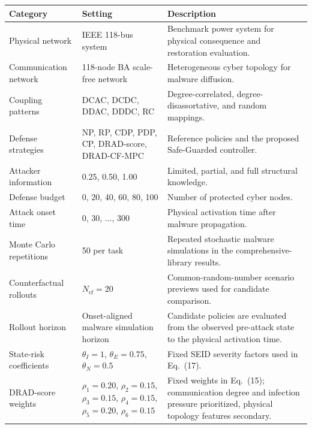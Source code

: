 \documentclass[10pt]{article}
\makeatletter
\newenvironment{exporttable}{\par\noindent\begin{minipage}{\linewidth}\def\@captype{table}}{\end{minipage}\par}
\makeatother
\begin{document}
\begin{exporttable}
\centering
\caption{Reference configuration for the comprehensive policy-library assessment. Rolling and local-information protocols specify their own rollout counts and risk profiles.}
\label{tab:experimental_configuration}
\small
\begin{tabular}{p{} p{} p{}}
\toprule
\rowcolor{TableHeader}
Category & Setting & Description \\
\midrule
\rowcolor{RowScenario}
Physical network & IEEE 118-bus system & Benchmark power system for physical consequence and restoration evaluation. \\
\rowcolor{RowBaseline}
Communication network & 118-node BA scale-free network & Heterogeneous cyber topology for malware diffusion. \\
\rowcolor{RowScenario}
Coupling patterns & DCAC, DCDC, DDAC, DDDC, RC & Degree-correlated, degree-disassortative, and random mappings. \\
\rowcolor{RowProposed}
Defense strategies & NP, RP, CDP, PDP, CP, DRAD-score, DRAD-CF-MPC & Reference policies and the proposed Safe-Guarded controller. \\
\rowcolor{RowRisk}
Attacker information & 0.25, 0.50, 1.00 & Limited, partial, and full structural knowledge. \\
\rowcolor{RowBudget}
Defense budget & 0, 20, 40, 60, 80, 100 & Number of protected cyber nodes. \\
\rowcolor{RowPhysical}
Attack onset time & 0, 30, $\ldots$, 300 & Physical activation time after malware propagation. \\
\rowcolor{RowScenario}
Monte Carlo repetitions & 50 per task & Repeated stochastic malware simulations in the comprehensive-library results. \\
\rowcolor{RowBaseline}
Counterfactual rollouts & $N_{\mathrm{cf}}=20$ & Common-random-number scenario previews used for candidate comparison. \\
\rowcolor{RowScenario}
Rollout horizon & Onset-aligned malware simulation horizon & Candidate policies are evaluated from the observed pre-attack state to the physical activation time. \\
\rowcolor{RowRisk}
State-risk coefficients & $\theta_I=1$, $\theta_E=0.75$, $\theta_N=0.5$ & Fixed SEID severity factors used in Eq.~(17). \\
\rowcolor{RowBudget}
DRAD-score weights & $\rho_1{=}0.20$, $\rho_2{=}0.15$, $\rho_3{=}0.15$, $\rho_4{=}0.15$, $\rho_5{=}0.20$, $\rho_6{=}0.15$ & Fixed weights in Eq.~(15); communication degree and infection pressure prioritized, physical topology features secondary. \\

\end{tabular}
\end{exporttable}
\end{document}
